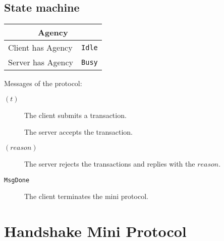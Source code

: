\documentclass{report}
\newcommand{\hsref}[1]{}
\newcommand{\hsref}[1]
                    {\href{https://github.com/input-output-hk/ouroboros-network/blob/master/#1}
                      {\emph{Haskell source: #1}}}
\newcommand{\state}[1]{\texttt{#1}}
\newcommand{\msg}[1]{\texttt{#1}}
\newcommand{\Idle}{\state{Idle}}
\newcommand{\Busy}{\state{Busy}}
\newcommand{\Done}{\state{Done}}
\newcommand{\MsgDone}{\msg{MsgDone}}
\theoremstyle{definition}{
  \newtheorem{lemma}{Lemma}[section] %
  \newtheorem{definition}[lemma]{Definition}
}
\theoremstyle{theorem}{
  \newtheorem{invariant}[lemma]{Invariant}
  \newtheorem{proofobligation}[lemma]{Proof Obligation}
}
\numberwithin{equation}{lemma}
\begin{document}
\subsection{State machine}

\begin{tabular}{|l|l|}
  \hline
  \multicolumn{2}{|c|}{Agency} \\ \hline
  Client has Agency & \Idle \\ \hline
  Server has Agency & \Busy \\  \hline
\end{tabular}


Messages of the protocol:
\begin{description}
\item [\SubmitTx{} {\boldmath $(t)$}]
      The client submits a transaction.
\item [\AcceptTx]
      The server accepts the transaction.
\item [\RejectTx{} {\boldmath $(reason)$}]
      The server rejects the transactions and replies with the $reason$.
\item [\MsgDone]
      The client terminates the mini protocol.
\end{description}

\section{Handshake Mini Protocol}
\hsref{src/Ouroboros/Network/Protocol/Handshake/Type.hs}
\label{handshake-protocol}
\newcommand{\Propose}{\state{Propose}}
\newcommand{\Confirm}{\state{Confirm}}
\newcommand{\ProposeVersions}{\msg{ProposeVersions}}
\newcommand{\AcceptVersion}{\msg{AcceptVersion}}
\newcommand{\Refuse}{\msg{Refuse}}
\end{document}
